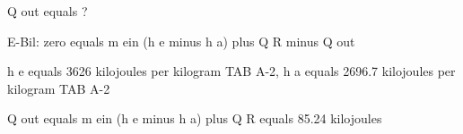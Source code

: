 Q out equals ?

E-Bil: zero equals m ein (h e minus h a) plus Q R minus Q out

h e equals 3626 kilojoules per kilogram TAB A-2, h a equals 2696.7 kilojoules per kilogram TAB A-2

Q out equals m ein (h e minus h a) plus Q R equals 85.24 kilojoules